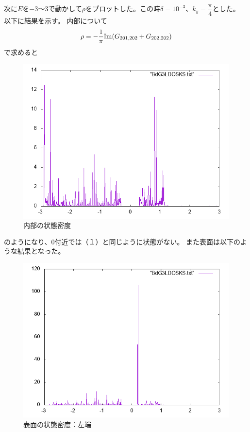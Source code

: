 \documentclass{jarticle}
\begin{document}
次に$E$を$-3$〜$3$で動かして$\rho$をプロットした。この時$\delta=10^{-3}$、$k_y=\dfrac{\pi}{4}$とした。
以下に結果を示す。
内部について
\begin{align}
\rho=-\dfrac{1}{\pi}{\rm Im}(G_{201,202}+G_{202,202})
\end{align}
で求めると
\begin{figure}[H]
	\centering
	\includegraphics[scale=0.7]{BdG3KSLDOSinternal.png}
	\caption{内部の状態密度}
\end{figure}
のようになり、$0$付近では（１）と同じように状態がない。
また表面は以下のような結果となった。
\begin{figure}[H]
	\centering
	\includegraphics[scale=0.7]{BdG3KSLDOSedge1.png}
	\caption{表面の状態密度：左端}
\end{figure}
\end{document}
